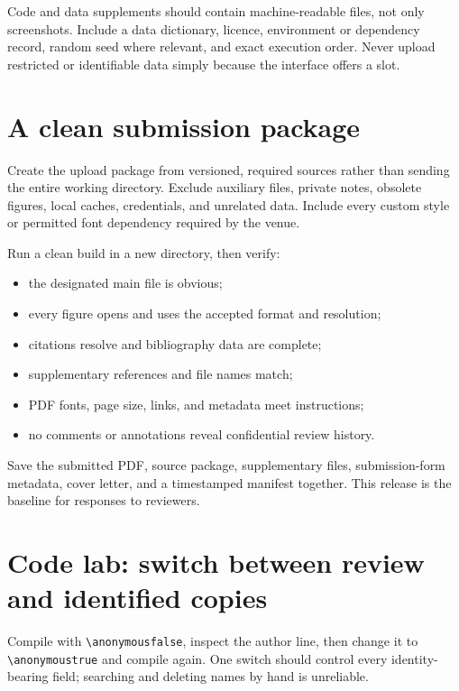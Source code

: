 Code and data supplements should contain machine-readable files, not only
screenshots. Include a data dictionary, licence, environment or dependency
record, random seed where relevant, and exact execution order. Never upload
restricted or identifiable data simply because the interface offers a slot.

\section{A clean submission package}

Create the upload package from versioned, required sources rather than sending
the entire working directory. Exclude auxiliary files, private notes, obsolete
figures, local caches, credentials, and unrelated data. Include every custom
style or permitted font dependency required by the venue.

Run a clean build in a new directory, then verify:

\begin{itemize}
  \item the designated main file is obvious;
  \item every figure opens and uses the accepted format and resolution;
  \item citations resolve and bibliography data are complete;
  \item supplementary references and file names match;
  \item PDF fonts, page size, links, and metadata meet instructions;
  \item no comments or annotations reveal confidential review history.
\end{itemize}

\begin{goodpractice}
Save the submitted PDF, source package, supplementary files, submission-form
metadata, cover letter, and a timestamped manifest together. This release is the
baseline for responses to reviewers.
\end{goodpractice}

\section{Code lab: switch between review and identified copies}

\begin{codelab}
Compile with \verb|\anonymousfalse|, inspect the author line, then change it to
\verb|\anonymoustrue| and compile again. One switch should control every
identity-bearing field; searching and deleting names by hand is unreliable.
\end{codelab}

